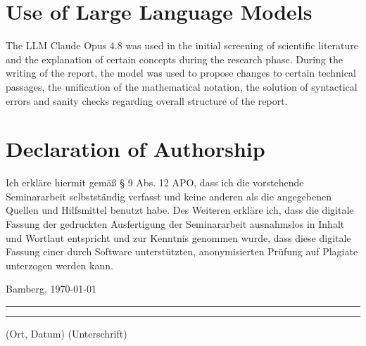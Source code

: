 \documentclass[a4paper]{article}
\begin{document}



\newpage
\section*{Use of Large Language Models}

The LLM Claude Opus 4.8 was used in the initial screening of scientific literature and the explanation of certain concepts during the research phase. During the writing of the report, the model was used to propose changes to certain technical passages, the unification of the mathematical notation, the solution of syntactical errors and sanity checks regarding overall structure of the report. 




{\parindent 0cm
\section*{Declaration of Authorship}
Ich erkläre hiermit gemäß § 9 Abs. 12 APO, dass ich die vorstehende Seminararbeit selbstständig verfasst und keine anderen als die angegebenen Quellen und Hilfsmittel benutzt habe. Des Weiteren erkläre ich, dass die digitale Fassung der gedruckten Ausfertigung der Seminararbeit ausnahmslos in Inhalt und Wortlaut entspricht und zur Kenntnis genommen wurde, dass diese digitale Fassung einer durch Software unterstützten, anonymisierten Prüfung auf Plagiate unterzogen werden kann.\\
\vspace{2\baselineskip}
  
Bamberg, \today

\rule[0.5em]{14em}{0.5pt} \hspace{0.25\linewidth}\rule[0.5em]{14em}{0.5pt}
\vspace{1em}
\hspace{4em} (Ort, Datum) \hspace{0.51\linewidth} (Unterschrift)
}
\end{document}
